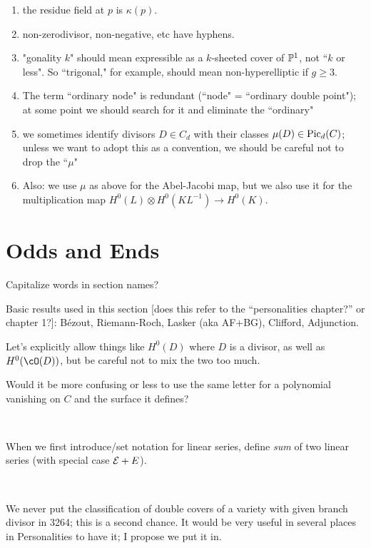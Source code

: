 \documentclass[12pt, leqno]{book}
\begin{document}
\begin{enumerate}
\item the residue field at $p$ is $\kappa(p)$.

\item non-zerodivisor, non-negative, etc have hyphens.

\item "gonality $k$" should mean expressible as a $k$-sheeted cover of $\PP^1$, not ``$k$ or less". So ``trigonal," for example, should mean non-hyperelliptic if $g \geq 3$.

\item The term ``ordinary node" is redundant (``node" = ``ordinary double point"); at some point we should search for it and eliminate the ``ordinary"

\item we sometimes identify divisors $D \in C_d$ with their classes $\mu(D) \in \pic_d(C)$; unless we want to adopt this as a convention, we should be careful not to drop the ``$\mu$"

\item Also: we use $\mu$ as above for the Abel-Jacobi map, but we also use it for the multiplication map $H^0(L) \otimes H^0(KL^{-1}) \to H^0(K)$.

\end{enumerate}

\section{Odds and Ends}

Capitalize words in section names?

Basic results used in this section [does this refer to the ``personalities chapter?'' or chapter 1?]: B\'ezout, Riemann-Roch, Lasker (aka AF+BG), Clifford, Adjunction.

Let's explicitly allow things like $H^0(D)$ where $D$ is a divisor, as well as $H^0(\cO(D))$, but be careful not to mix the two too much.

Would it be more confusing or less to use the same letter for a polynomial vanishing on $C$ and the surface it defines?

\

When we first introduce/set notation for linear series, define \emph{sum} of two linear series 
(with special case $\cE + E$).

\

We never put the classification of double covers of a variety with given branch divisor in 3264; this is a second chance. It would be very useful in several places in Personalities to have it; I propose we put it in.
\end{document}
